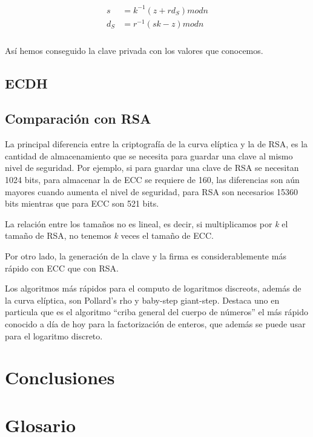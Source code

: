 \documentclass[11pt]{article}
\begin{document}
\begin{align}
\begin{split}
\textit{s} &= \textit{$k^{-1}$}(\textit{z} + \textit{r$d_S$}) mod \textit{n}\\
\textit{$d_S$} &= \textit{$r^{-1}$}(\textit{sk} - \textit{z}) mod \textit{n}\\
\end{split}
\end{align}

Así hemos conseguido la clave privada con los valores que conocemos.

\subsection{ECDH}

\subsection{Comparación con RSA}

La principal diferencia entre la criptografía de la curva elíptica y la de RSA, es la cantidad de almacenamiento que se necesita para guardar una clave al mismo nivel de seguridad. Por ejemplo, si para guardar una clave de RSA se necesitan 1024 bits, para almacenar la de ECC se requiere de 160, las diferencias son aún mayores cuando aumenta el nivel de seguridad, para RSA son necesarios 15360 bits mientras que para ECC son 521 bits.

La relación entre los tamaños no es lineal, es decir, si multiplicamos por \textit{k} el tamaño de RSA, no tenemos \textit{k} veces el tamaño de ECC.

Por otro lado, la generación de la clave y la firma es considerablemente más rápido con ECC que con RSA.


Los algoritmos más rápidos para el computo de logaritmos discreots, además de la curva elíptica, son Pollard's rho y baby-step giant-step. Destaca uno en particula que es el algoritmo ``criba general del cuerpo de números'' el más rápido conocido a día de hoy para la factorización de enteros, que además se puede usar para el logaritmo discreto.


\section{Conclusiones}




\appendix
\renewcommand{\thesection}{\Roman{section}}
\setcounter{section}{0}
\section{Glosario}
\end{document}
